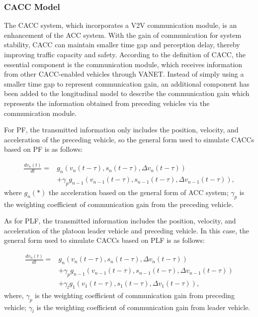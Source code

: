 \documentclass[journal]{IEEEtran}
\begin{document}
\subsubsection{CACC Model}

The CACC system, which incorporates a V2V communication module, is an enhancement of the ACC system. With the gain of communication for system stability, CACC can maintain smaller time gap and perception delay, thereby improving traffic capacity and safety. According to the definition of CACC\citep{dey2015review}, the essential component is the communication module, which receives information from other CACC-enabled vehicles through VANET. Instead of simply using a smaller time gap to represent communication gain, an additional component has been added to the longitudinal model to describe the communication gain which represents the information obtained from preceding vehicles via the communication module.


For PF, the transmitted information only includes the position, velocity, and acceleration of the preceding vehicle, so the general form used to simulate CACCs based on PF is as follows:

\begin{equation}
\begin{aligned}
\frac{d v_{n}(t)}{d t}=& g_{n}\left(v_{n}(t-\tau), s_{n}(t-\tau), \Delta v_{n}(t-\tau)\right) \\
&+\gamma_{p} g_{n-1}\left(v_{n-1}(t-\tau), s_{n-1}(t-\tau), \Delta v_{n-1}(t-\tau)\right),
\end{aligned}
\label{Eq2}
\end{equation}
where $g_n (*)$ the acceleration based on the general form of ACC system; $\gamma_p$ is the weighting coefficient of communication gain from the preceding vehicle.


As for PLF, the transmitted information includes the position, velocity, and acceleration of the platoon leader vehicle and preceding vehicle. In this case, the general form used to simulate CACCs based on PLF is as follows:

\begin{equation}
\begin{aligned}
\frac{d v_{n}(t)}{d t}=& g_{n}\left(v_{n}(t-\tau), s_{n}(t-\tau), \Delta v_{n}(t-\tau)\right) \\
&+\gamma_{p} g_{n-1}\left(v_{n-1}(t-\tau), s_{n-1}(t-\tau), \Delta v_{n-1}(t-\tau)\right) \\
&+\gamma_{l} g_{1}\left(v_{1}(t-\tau), s_{1}(t-\tau), \Delta v_{1}(t-\tau)\right),
\end{aligned}
\label{Eq3}
\end{equation}
where, $\gamma_p$ is the weighting coefficient of communication gain from preceding vehicle; $\gamma_l$ is the weighting coefficient of communication gain from leader vehicle.
\end{document}
